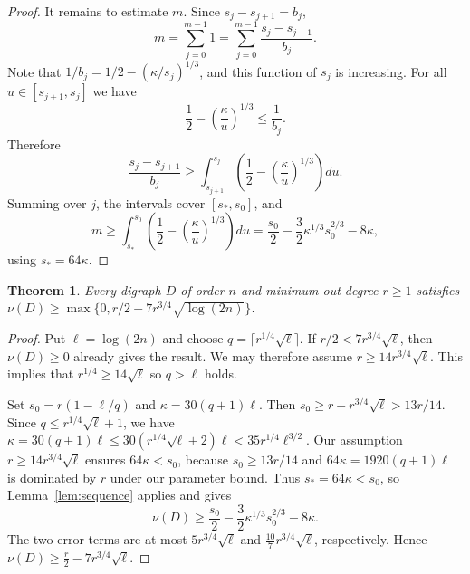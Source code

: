 \documentclass[10pt,a4paper]{article}
\newtheorem{theorem}{Theorem}[section]
\numberwithin{equation}{section}
\newcommand{\jbjcomment}[1]{\textcolor{blue}{JBJ: #1}}
\begin{document}
\begin{proof}
It remains to estimate $m$. Since $s_j-s_{j+1}=b_j$,
$$
m=\sum_{j=0}^{m-1}1=\sum_{j=0}^{m-1}\frac{s_j-s_{j+1}}{b_j}.
$$
Note that $1/b_j=1/2-(\kappa/s_j)^{1/3}$, and this function of $s_j$ is
increasing. %
For all $u\in [s_{j+1},s_j]$ we have 
$$
\frac12-\left(\frac{\kappa}{u}\right)^{1/3}\le\frac1{b_j}.
$$
Therefore
$$
\frac{s_j-s_{j+1}}{b_j}
\ge\int_{s_{j+1}}^{s_j}\left(\frac12-\left(\frac{\kappa}{u}\right)^{1/3}\right)du.
$$
Summing over $j$, the intervals cover $[s_\ast,s_0]$, and
$$
m\ge\int_{s_\ast}^{s_0}\left(\frac12-\left(\frac{\kappa}{u}\right)^{1/3}\right)du
=\frac{s_0}{2}-\frac32\kappa^{1/3}s_0^{2/3}-8\kappa,
$$
using $s_\ast=64\kappa$.
\end{proof}


\begin{theorem}\label{thm:local}
Every digraph $D$ of order $n$ and minimum out-degree $r\ge1$
satisfies
$\nu(D)\ge\max\{0,r/2-7r^{3/4}\sqrt{\log(2n)}\}$.
\end{theorem}

\begin{proof}
Put $\ell=\log(2n)$ and choose $q=\lceil r^{1/4}\sqrt\ell\rceil$.
If $r/2<7r^{3/4}\sqrt\ell$, then $\nu(D)\ge0$ already gives the result.
We may therefore assume $r\ge14r^{3/4}\sqrt\ell$. This implies that $r^{1/4}\geq 14\sqrt{\ell}$ so $q>\ell$ holds.


Set $s_0=r(1-\ell/q)$ and $\kappa=30(q+1)\ell$. Then
$s_0\ge r-r^{3/4}\sqrt\ell>13r/14$.
Since $q\le r^{1/4}\sqrt{\ell}+1$, we have
$\kappa=30(q+1)\ell \le 30(r^{1/4}\sqrt{\ell}+2)\ell<35r^{1/4}\ell^{3/2}$.
Our assumption $r\ge14r^{3/4}\sqrt{\ell}$ ensures $64\kappa<s_0$, because $s_0\ge 13r/14$ and $64\kappa=1920(q+1)\ell$ is dominated by $r$ under our parameter bound.
Thus $s_\ast=64\kappa<s_0$, so Lemma~\ref{lem:sequence} applies and
gives
$$
\nu(D)\ge\frac{s_0}{2}-\frac32\kappa^{1/3}s_0^{2/3}-8\kappa.
$$
The two error terms are at most   $5r^{3/4}\sqrt\ell$ and 
$\frac{10}{7}r^{3/4}\sqrt\ell$, 
respectively. Hence
$
\nu(D)\ge\frac r2-7r^{3/4}\sqrt\ell$.
\end{proof}





\end{document}
